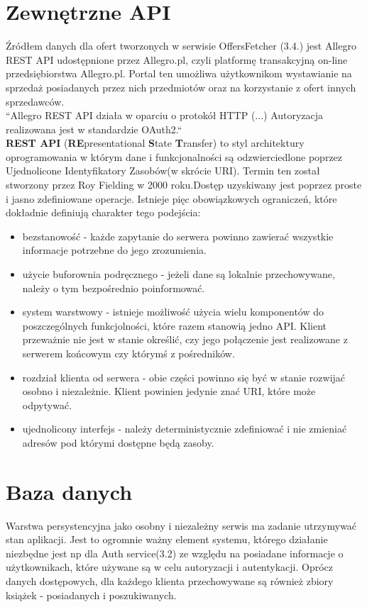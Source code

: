 \section{Zewnętrzne API}
Źródłem danych dla ofert tworzonych w serwisie OffersFetcher (3.4.)
jest Allegro REST API udostępnione przez Allegro.pl, czyli platformę transakcyjną on-line przedsiębiorstwa Allegro.pl. Portal ten umożliwa użytkownikom wystawianie na sprzedaż posiadanych przez nich przedmiotów oraz na korzystanie z ofert innych sprzedawców.\\
``Allegro REST API działa w oparciu o protokół HTTP (...) Autoryzacja realizowana jest w standardzie OAuth2.``\cite{allegroApi}\\ \newpage
\textbf{REST API} (\textbf{RE}presentational \textbf{S}tate \textbf{T}ransfer) to styl architektury oprogramowania w którym dane i funkcjonalności są odzwierciedlone  poprzez Ujednolicone Identyfikatory Zasobów(w skrócie URI). Termin ten został stworzony przez Roy Fielding w 2000 roku\cite{fielding}.Dostęp uzyskiwany jest poprzez proste i jasno zdefiniowane operacje. \linebreak Istnieje pięc obowiązkowych ograniczeń, które dokładnie definiują charakter tego podejścia:
\begin{itemize}
	\item bezstanowość - każde zapytanie do serwera powinno zawierać wszystkie informacje potrzebne do jego zrozumienia.
	\item użycie buforownia podręcznego - jeżeli dane są lokalnie przechowywane, należy o tym bezpośrednio poinformować.
	\item system warstwowy - istnieje możliwość użycia wielu komponentów do poszczególnych funkcjolności, które razem stanowią jedno API. Klient przeważnie nie jest w stanie określić, czy jego połączenie jest realizowane z serwerem końcowym czy którymś z pośredników.
	\item rozdział klienta od serwera - obie części powinno się być w stanie rozwijać osobno i niezależnie. Klient powinien jedynie znać URI, które może odpytywać.
	\item ujednolicony interfejs - należy deterministycznie zdefiniować i nie zmieniać adresów pod którymi dostępne będą zasoby. 
\end{itemize}
\cite{rest}

\section{Baza danych}
Warstwa persystencyjna jako osobny i niezależny serwis ma zadanie utrzymywać stan aplikacji. Jest to ogromnie ważny element systemu, którego działanie niezbędne jest np dla Auth service(3.2) ze względu na posiadane informacje o użytkownikach, które używane są w celu autoryzacji i autentykacji.
Oprócz danych dostępowych, dla każdego klienta przechowywane są również zbiory książek - posiadanych i poszukiwanych.\linebreak

